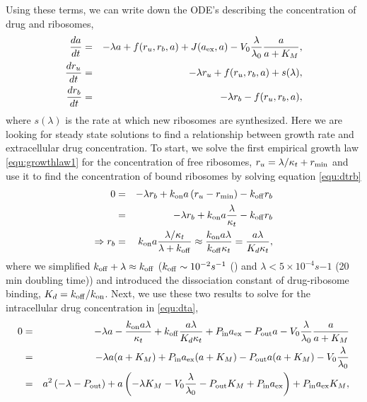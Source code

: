Using these terms, we can write down the ODE's describing the concentration of drug and ribosomes,
\begin{eqnarray}
    {d a\over d t} &=& -\lambda a + f(r_u, r_b, a) + J(a_{\mathrm{ex}}, a) - V_0 {\lambda\over\lambda_0}{a\over a + K_M},\label{equ:dta}\\
    {dr_u\over dt} &=& -\lambda r_u + f(r_u, r_b, a) + s(\lambda),\label{equ:dtru}\\
    {dr_b\over dt} &=& -\lambda r_b - f(r_u, r_b, a)\label{equ:dtrb},
\end{eqnarray}
where $s(\lambda)$ is the rate at which new ribosomes are synthesized. Here we are looking for steady state solutions to find a relationship between growth rate and extracellular drug concentration.
To start, we solve the first empirical growth law \ref{equ:growthlaw1}  for the concentration of free ribosomes, $r_u = \lambda/\kappa_t + r_{\mathrm{min}}$ and use it to find the concentration of bound ribosomes by solving equation \ref{equ:dtrb}
\begin{eqnarray}
    0 &=& -\lambda r_b + k_{\mathrm{on}}a\,(r_u-r_{\mathrm{min}}) - k_{\mathrm{off}} r_b \nonumber\\
    &=& -\lambda r_b + k_{\mathrm{on}}a\frac{\lambda}{\kappa_t} - k_{\mathrm{off}} r_b \nonumber\\
    \Rightarrow r_b &=& k_{\mathrm{on}}a{\lambda/\kappa_t \over \lambda + k_{\mathrm{off}} } \approx {k_{\mathrm{on}} a\lambda \over k_{\mathrm{off}} \kappa_t}={a\lambda \over K_d \kappa_t},
\end{eqnarray}
where we simplified $k_{\mathrm{off}} + \lambda \approx k_{\mathrm{off}}$ ($k_{\mathrm{off}}\sim 10^{-2} s^{-1}$ () and $\lambda < 5\times 10^{-4} s{-1}$ (20 min doubling time)) and introduced the dissociation constant of drug-ribosome binding, $K_d = k_{\mathrm{off}}/k_{\mathrm{on}}$.
Next, we use these two results to solve for the intracellular drug concentration in \ref{equ:dta},
\begin{eqnarray}
    0&=&-\lambda a -\frac{k_{\mathrm{on}} a \lambda}{\kappa_t}+ k_{\mathrm{off}} {a\lambda \over K_d \kappa_t}+ P_{\mathrm{in}} a_{\mathrm{ex}} - P_{\mathrm{out}} a - V_0 {\lambda \over \lambda_0} {a \over a + K_M} \nonumber\\
    &=& -\lambda a (a+K_M) + P_{\mathrm{in}} a_{\mathrm{ex}} (a+K_M) - P_{\mathrm{out}} a(a+K_M) - V_0 \frac{\lambda}{\lambda_0}\nonumber \\
    &=& a^2 \left( -\lambda - P_{\mathrm{out}} \right) + a \left(-\lambda K_M - V_0 {\lambda \over \lambda_0} - P_{\mathrm{out}} K_M + P_{\mathrm{in}} a_{\mathrm{ex}}\right) + P_{\mathrm{in}} a_{\mathrm{ex}} K_M,\label{equ:lambda_poly_1}
\end{eqnarray}

